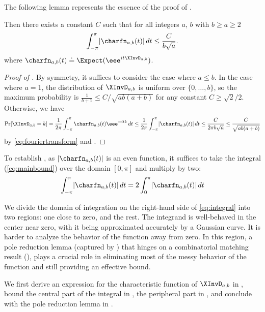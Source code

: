 The following lemma represents the essence of the proof of 
 .
\begin{lemma}
    \label{thm:integral}
    Then there exists a constant $C$ such that for all integers $a$, $b$ with $b \ge a \ge 2$
      \begin{equation}
        \label{eq:mainbound}
        \int_{-\pi}^{\pi} \lvert \charfn_{a,b}(t)\rvert\,dt \le \frac{C}{b\sqrt{a}}.
    \end{equation}  
where $\charfn_{a,b}(t) \doteq \Expect(\eee^{it\XInvD_{a,b}})$. 
\end{lemma}
\begin{proof}[Proof of ]
By symmetry, it suffices to consider the case where $a \le b$. In the case where $a=1$, the distribution of $\XInvD_{a,b}$ is uniform over $\{0,\dots,b\}$, so the maximum probability is $\frac{1}{b+1} \le C/\sqrt{ab(a+b)}$ for any constant $C \ge \sqrt{2}/2$. Otherwise, 
we have
\[ \Pr[\XInvD_{a,b}=k] = \frac{1}{2\pi} \int_{-\pi}^{\pi}\charfn_{a,b}(t)\eee^{-itk}\,dt \le \frac{1}{2\pi} \int_{-\pi}^{\pi} \lvert\charfn_{a,b}(t)\rvert\,dt \le \frac{C}{2\pi b\sqrt{a}} \le \frac{C}{\sqrt{ab(a+b)}} \]
by \eqref{eq:fouriertransform} and .
\end{proof}

To establish , as $\lvert \charfn_{a,b}(t) \rvert$ is an even function, it suffices to take the integral (\ref{eq:mainbound}) over the domain $[0,\pi]$ and multiply by two: 
\begin{equation}
    \label{eq:integral}
    \int_{-\pi}^{\pi} \lvert \charfn_{a,b}(t)\rvert\,dt 
    = 2 \int_0^{\pi} \lvert \charfn_{a,b}(t)\rvert\,dt 
\end{equation}  

We divide the domain of integration on the right-hand side of \eqref{eq:integral} into two regions: one close to zero, and the rest. The integrand is well-behaved in the center near zero, with it being approximated accurately by a Gaussian curve. It is harder to analyze the behavior of the function away from zero. In this region, a pole reduction lemma (captured by ) that hinges on a combinatorial matching result (), plays a crucial role in eliminating most of the messy behavior of the function and still providing an effective bound.

We first derive an expression for the characteristic function of $\XInvD_{a,b}$ in , bound the central part of the integral in , the peripheral part in , and conclude with the pole reduction lemma in .

